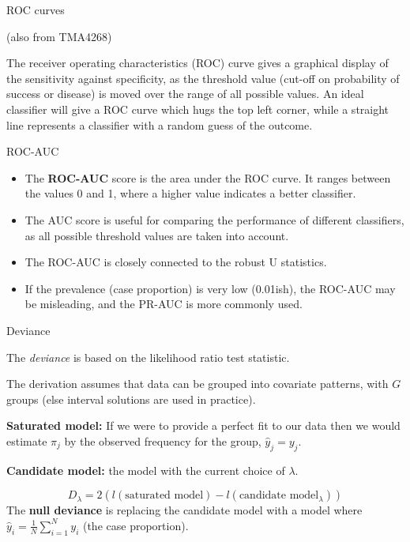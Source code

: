 \documentclass[
  ignorenonframetext,
]{beamer}
\providecommand{\tightlist}{%
  \setlength{\itemsep}{0pt}\setlength{\parskip}{0pt}}
\begin{document}
\begin{frame}

\begin{block}{ROC curves}

(also from TMA4268)

The receiver operating characteristics (ROC) curve gives a graphical
display of the sensitivity against specificity, as the threshold value
(cut-off on probability of success or disease) is moved over the range
of all possible values. An ideal classifier will give a ROC curve which
hugs the top left corner, while a straight line represents a classifier
with a random guess of the outcome.

\end{block}

\end{frame}

\begin{frame}

\begin{block}{ROC-AUC}

\begin{itemize}
\tightlist
\item
  The \textbf{ROC-AUC} score is the area under the ROC curve. It ranges
  between the values 0 and 1, where a higher value indicates a better
  classifier. 
\item
  The AUC score is useful for comparing the performance of different
  classifiers, as all possible threshold values are taken into account.
\item
  The ROC-AUC is closely connected to the robust U statistics.
\item
  If the prevalence (case proportion) is very low (0.01ish), the ROC-AUC
  may be misleading, and the PR-AUC is more commonly used.
\end{itemize}

\end{block}

\end{frame}

\begin{frame}

\begin{block}{Deviance}

The \emph{deviance} is based on the likelihood ratio test statistic.

The derivation assumes that data can be grouped into covariate patterns,
with \(G\) groups (else interval solutions are used in practice).

\textbf{Saturated model:} If we were to provide a perfect fit to our
data then we would estimate \(\pi_j\) by the observed frequency for the
group, \(\hat{y}_j=y_j\).

\textbf{Candidate model:} the model with the current choice of
\(\lambda\).

\[D_{\lambda}=2(l(\text{saturated model})-l(\text{candidate model}_{\lambda}))\]
The \textbf{null deviance} is replacing the candidate model with a model
where \(\hat{y}_i=\frac{1}{N}\sum_{i=1}^N y_i\) (the case proportion).

\end{block}

\end{frame}
\end{document}
